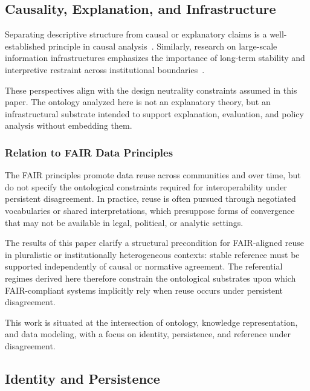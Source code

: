 \subsection{Causality, Explanation, and Infrastructure}

Separating descriptive structure from causal or explanatory claims is a
well-established principle in causal analysis~\citep{pearl2009causality}.
Similarly, research on large-scale information infrastructures emphasizes
the importance of long-term stability and interpretive restraint across
institutional boundaries~\citep{edwards2011infrastructure}.

These perspectives align with the design neutrality constraints assumed in this paper.
The ontology analyzed here is not an explanatory theory, but an
infrastructural substrate intended to support explanation, evaluation, and
policy analysis without embedding them.

\subsubsection{Relation to FAIR Data Principles}

The FAIR principles promote data reuse across communities and over time,
but do not specify the ontological constraints required for interoperability
under persistent disagreement.
In practice, reuse is often pursued through
negotiated vocabularies or shared interpretations,
which presuppose forms of convergence that may not be
available in legal, political, or analytic settings.

The results of this paper clarify a structural precondition for FAIR-aligned
reuse in pluralistic or institutionally heterogeneous contexts:
stable reference must be supported independently of
causal or normative agreement.
The referential regimes derived here therefore constrain the
ontological substrates upon which FAIR-compliant systems implicitly rely
when reuse occurs under persistent disagreement.



This work is situated at the intersection of ontology,
knowledge representation, and data modeling,
with a focus on identity, persistence, and reference under disagreement.

\subsection{Identity and Persistence}

